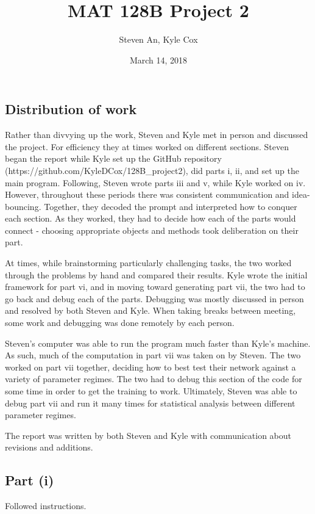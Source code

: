 \documentclass[12pt]{article}
\begin{document}
 
\title{MAT 128B Project 2}
\author{Steven An, Kyle Cox}
\date{March 14, 2018}
\maketitle

\subsection*{Distribution of work}
Rather than divvying up the work, Steven and Kyle met in person and discussed the project. For efficiency they at times worked on different sections. Steven began the report while Kyle set up the GitHub repository (https://github.com/KyleDCox/128B\_project2), did parts i, ii, and set up the main program. Following, Steven wrote parts iii and v, while Kyle worked on iv. However, throughout these periods there was consistent communication and idea-bouncing. Together, they decoded the prompt and interpreted how to conquer each section. As they worked, they had to decide how each of the parts would connect - choosing appropriate objects and methods took deliberation on their part.


At times, while brainstorming particularly challenging tasks, the two worked through the problems by hand and compared their results. Kyle wrote the initial framework for part vi, and in moving toward generating part vii, the two had to go back and debug each of the parts. Debugging was mostly discussed in person and resolved by both Steven and Kyle. When taking breaks between meeting, some work and debugging was done remotely by each person.


Steven's computer was able to run the program much faster than Kyle's machine. As such, much of the computation in part vii was taken on by Steven. The two worked on part vii together, deciding how to best test their network against a variety of parameter regimes. The two had to debug this section of the code for some time in order to get the training to work. Ultimately, Steven was able to debug part vii and run it many times for statistical analysis between different parameter regimes.


The report was written by both Steven and Kyle with communication about revisions and additions.

\subsection*{Part (i)}
Followed instructions.
\end{document}
